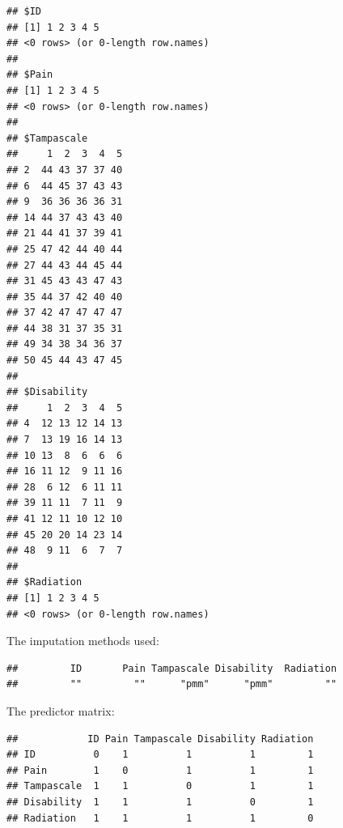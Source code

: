 \documentclass[]{book}
\newenvironment{Shaded}{\begin{snugshade}}{\end{snugshade}}
\newcommand{\OperatorTok}[1]{\textcolor[rgb]{0.81,0.36,0.00}{\textbf{#1}}}
\newcommand{\NormalTok}[1]{#1}
\theoremstyle{definition}
\theoremstyle{definition}
\theoremstyle{definition}
\theoremstyle{remark}
\begin{document}
\begin{Shaded}
\end{Shaded}

\begin{verbatim}
## $ID
## [1] 1 2 3 4 5
## <0 rows> (or 0-length row.names)
## 
## $Pain
## [1] 1 2 3 4 5
## <0 rows> (or 0-length row.names)
## 
## $Tampascale
##     1  2  3  4  5
## 2  44 43 37 37 40
## 6  44 45 37 43 43
## 9  36 36 36 36 31
## 14 44 37 43 43 40
## 21 44 41 37 39 41
## 25 47 42 44 40 44
## 27 44 43 44 45 44
## 31 45 43 43 47 43
## 35 44 37 42 40 40
## 37 42 47 47 47 47
## 44 38 31 37 35 31
## 49 34 38 34 36 37
## 50 45 44 43 47 45
## 
## $Disability
##     1  2  3  4  5
## 4  12 13 12 14 13
## 7  13 19 16 14 13
## 10 13  8  6  6  6
## 16 11 12  9 11 16
## 28  6 12  6 11 11
## 39 11 11  7 11  9
## 41 12 11 10 12 10
## 45 20 20 14 23 14
## 48  9 11  6  7  7
## 
## $Radiation
## [1] 1 2 3 4 5
## <0 rows> (or 0-length row.names)
\end{verbatim}

The imputation methods used:

\begin{Shaded}
\end{Shaded}

\begin{verbatim}
##         ID       Pain Tampascale Disability  Radiation 
##         ""         ""      "pmm"      "pmm"         ""
\end{verbatim}

The predictor matrix:

\begin{Shaded}
\end{Shaded}

\begin{verbatim}
##            ID Pain Tampascale Disability Radiation
## ID          0    1          1          1         1
## Pain        1    0          1          1         1
## Tampascale  1    1          0          1         1
## Disability  1    1          1          0         1
## Radiation   1    1          1          1         0
\end{verbatim}
\end{document}
